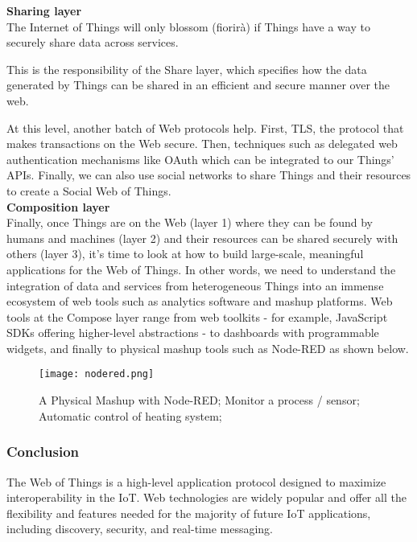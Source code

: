 \textbf{Sharing layer}\\

The Internet of Things will only blossom (fiorirà) if Things have a way to
securely share data across services.

This is the responsibility of the Share layer, which specifies how the data
generated by Things can be shared in an efficient and secure manner over
the web.

At this level, another batch of Web protocols help.
First, TLS, the protocol that makes transactions on the Web secure.
Then, techniques such as delegated web authentication mechanisms like OAuth
which can be integrated to our Things' APIs. Finally, we can also use social
networks to share Things and their resources to create a Social Web of
Things.\\

\textbf{Composition layer}\\

Finally, once Things are on the Web (layer 1) where they can be found by humans
and machines (layer 2) and their resources can be shared securely with others
(layer 3), it's time to look at how to build large-scale, meaningful
applications for the Web of Things. In other words, we need to understand the
integration of data and services from heterogeneous Things into an immense
ecosystem of web tools such as analytics software and mashup platforms.
Web tools at the Compose layer range from web toolkits - for example,
JavaScript SDKs offering higher-level abstractions - to dashboards with
programmable widgets, and finally to physical mashup tools such as Node-RED as
shown below.

\begin{figure}[H]
  \centering
  \texttt{[image: nodered.png]}
  \caption{A Physical Mashup with Node-RED;
Monitor a process / sensor;
Automatic control of heating system;}
  \label{fig:nodered}
\end{figure}

\subsubsection{Conclusion}

The Web of Things is a high-level application protocol designed to maximize
interoperability in the IoT. Web technologies are widely popular and offer all
the flexibility and features needed for the majority of future IoT
applications, including discovery, security, and real-time messaging.\\

